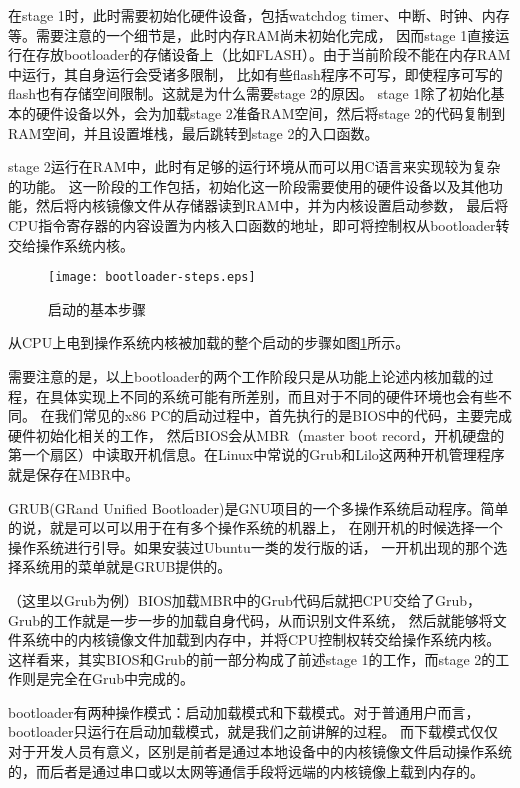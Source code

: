在stage 1时，此时需要初始化硬件设备，包括watchdog timer、中断、时钟、内存等。需要注意的一个细节是，此时内存RAM尚未初始化完成，
因而stage 1直接运行在存放bootloader的存储设备上（比如FLASH）。由于当前阶段不能在内存RAM中运行，其自身运行会受诸多限制，
比如有些flash程序不可写，即使程序可写的flash也有存储空间限制。这就是为什么需要stage 2的原因。
stage 1除了初始化基本的硬件设备以外，会为加载stage 2准备RAM空间，然后将stage 2的代码复制到RAM空间，并且设置堆栈，最后跳转到stage 2的入口函数。

stage 2运行在RAM中，此时有足够的运行环境从而可以用C语言来实现较为复杂的功能。
这一阶段的工作包括，初始化这一阶段需要使用的硬件设备以及其他功能，然后将内核镜像文件从存储器读到RAM中，并为内核设置启动参数，
最后将CPU指令寄存器的内容设置为内核入口函数的地址，即可将控制权从bootloader转交给操作系统内核。

\begin{figure}[htbp]
  \centering
  \texttt{[image: bootloader-steps.eps]}
  \caption{启动的基本步骤}\label{fig:bootloader-steps} 
\end{figure}

从CPU上电到操作系统内核被加载的整个启动的步骤如图\ref{fig:bootloader-steps}所示。

需要注意的是，以上bootloader的两个工作阶段只是从功能上论述内核加载的过程，在具体实现上不同的系统可能有所差别，而且对于不同的硬件环境也会有些不同。
在我们常见的x86 PC的启动过程中，首先执行的是BIOS中的代码，主要完成硬件初始化相关的工作，
然后BIOS会从MBR（master boot record，开机硬盘的第一个扇区）中读取开机信息。在Linux中常说的Grub和Lilo这两种开机管理程序就是保存在MBR中。

\begin{note}
GRUB(GRand Unified Bootloader)是GNU项目的一个多操作系统启动程序。简单的说，就是可以可以用于在有多个操作系统的机器上，
在刚开机的时候选择一个操作系统进行引导。如果安装过Ubuntu一类的发行版的话， 一开机出现的那个选择系统用的菜单就是GRUB提供的。
\end{note}

（这里以Grub为例）BIOS加载MBR中的Grub代码后就把CPU交给了Grub，Grub的工作就是一步一步的加载自身代码，从而识别文件系统，
然后就能够将文件系统中的内核镜像文件加载到内存中，并将CPU控制权转交给操作系统内核。
这样看来，其实BIOS和Grub的前一部分构成了前述stage 1的工作，而stage 2的工作则是完全在Grub中完成的。

\begin{note}
bootloader有两种操作模式：启动加载模式和下载模式。对于普通用户而言，bootloader只运行在启动加载模式，就是我们之前讲解的过程。
而下载模式仅仅对于开发人员有意义，区别是前者是通过本地设备中的内核镜像文件启动操作系统的，而后者是通过串口或以太网等通信手段将远端的内核镜像上载到内存的。
\end{note}

